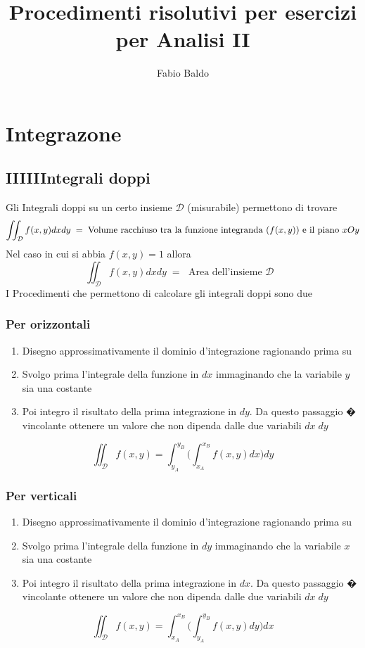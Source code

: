 \documentclass[10pt,a4paper]{report}
\author{Fabio Baldo}
\title{Procedimenti risolutivi per esercizi per Analisi II}
\begin{document}
	\section*{Integrazone}
	
		\subsection*{IIIIIIntegrali doppi}
			Gli Integrali doppi su un certo insieme $ \mathcal{D} $ (misurabile) permettono di trovare
			\[ \iint_{\mathcal{D}} f(x,y)dxdy \; = \; \text{Volume racchiuso tra la funzione integranda ($ f(x,y) $) e il piano $ xOy $} \]
			Nel caso in cui si abbia $ f(x,y) = 1 $ allora 
			\[ \iint_{\mathcal{D}} f(x,y) dxdy \; = \; \text{ Area dell'insieme $\mathcal{D}$  }\]
			I Procedimenti che permettono di calcolare gli integrali doppi sono due
				\subsubsection{Per orizzontali}
				\begin{enumerate}
					\item Disegno approssimativamente il dominio d'integrazione ragionando prima su 
					\item Svolgo prima l'integrale della funzione in $ dx $ immaginando che la variabile $ y $ sia una costante 
					\item Poi integro il risultato della prima integrazione in $ dy $. Da questo passaggio � vincolante ottenere un valore che non dipenda dalle due variabili $ dx \; dy $
				\end{enumerate}
				\[ \iint_{\mathcal{D}} f(x,y) = \int_{y_{A}}^{y_{B}} \Big(\int_{x_{A}}^{x_{B}}f(x,y) dx\Big) dy \]
				\subsubsection{Per verticali}
				\begin{enumerate}
					\item Disegno approssimativamente il dominio d'integrazione ragionando prima su 
					\item Svolgo prima l'integrale della funzione in $ dy $ immaginando che la variabile $ x $ sia una costante 
					\item Poi integro il risultato della prima integrazione in $ dx $. Da questo passaggio � vincolante ottenere un valore che non dipenda dalle due variabili $ dx \; dy $
				\end{enumerate}
				\[ \iint_{\mathcal{D}} f(x,y) = \int_{x_{A}}^{x_{B}} \Big(\int_{y_{A}}^{y_{B}}f(x,y) dy\Big) dx \]
				
\end{document}
